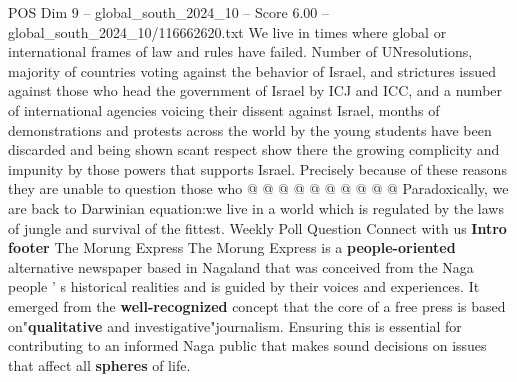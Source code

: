 \begin{textsample}{POS Dim 9 – global\_south\_2024\_10 – Score 6.00 – global\_south\_2024\_10/116662620.txt}
We live in times where global or international frames of law and rules have failed.
Number of UNresolutions, majority of countries voting against the behavior of Israel, and strictures issued against those who head the government of Israel by ICJ and ICC, and a number of international agencies voicing their dissent against Israel, months of demonstrations and protests across the world by the young students have been discarded and being shown scant respect show there the growing complicity and impunity by those powers that supports Israel.
Precisely because of these reasons they are unable to question those who @ @ @ @ @ @ @ @ @ @ Paradoxically, we are back to Darwinian equation:we live in a world which is regulated by the laws of jungle and survival of the fittest.
Weekly Poll Question Connect with us \textbf{Intro} \textbf{footer} The Morung Express The Morung Express is a \textbf{people-oriented} alternative newspaper based in Nagaland that was conceived from the Naga people ' s historical realities and is guided by their voices and experiences.
It emerged from the \textbf{well-recognized} concept that the core of a free press is based on"\textbf{qualitative} and investigative"journalism.
Ensuring this is essential for contributing to an informed Naga public that makes sound decisions on issues that affect all \textbf{spheres} of life.

\end{textsample}
